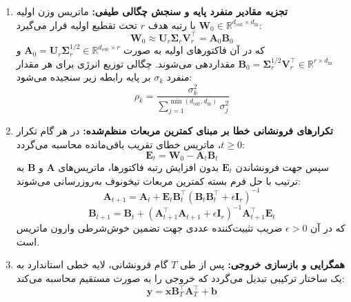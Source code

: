 \begin{enumerate}
    \item \textbf{تجزیه مقادیر منفرد پایه و سنجش چگالی طیفی:}
    ماتریس وزن اولیه $\mathbf{W}_0 \in \mathbb{R}^{d_{\text{out}} \times d_{\text{in}}}$ با رتبه هدف $r$ تحت تقطیع اولیه قرار می‌گیرد:
    \begin{equation}
    \mathbf{W}_0 \approx \mathbf{U}_r \mathbf{\Sigma}_r \mathbf{V}_r^\top = \mathbf{A}_0 \mathbf{B}_0
    \end{equation}
    که در آن فاکتورهای اولیه به صورت $\mathbf{A}_0 = \mathbf{U}_r \mathbf{\Sigma}_r^{1/2} \in \mathbb{R}^{d_{\text{out}} \times r}$ و $\mathbf{B}_0 = \mathbf{\Sigma}_r^{1/2} \mathbf{V}_r^\top \in \mathbb{R}^{r \times d_{\text{in}}}$ مقداردهی می‌شوند. چگالی توزیع انرژی برای هر مقدار منفرد $\sigma_k$ بر پایه رابطه زیر سنجیده می‌شود:
    \begin{equation}
    \rho_k = \frac{\sigma_k^2}{\sum_{j=1}^{\min(d_{\text{out}}, d_{\text{in}})} \sigma_j^2}
    \end{equation}

    \item \textbf{تکرارهای فرونشانی خطا بر مبنای کمترین مربعات منظم‌شده:}
    در هر گام تکرار $t \ge 0$، ماتریس خطای تقریب باقی‌مانده محاسبه می‌گردد:
    \begin{equation}
    \mathbf{E}_t = \mathbf{W}_0 - \mathbf{A}_t \mathbf{B}_t
    \end{equation}
    سپس جهت فرونشاندن $\mathbf{E}_t$ بدون افزایش رتبه فاکتورها، ماتریس‌های $\mathbf{A}$ و $\mathbf{B}$ به ترتیب با حل فرم بسته کمترین مربعات تیخونوف به‌روزرسانی می‌شوند:
    \begin{equation}
    \mathbf{A}_{t+1} = \mathbf{A}_t + \mathbf{E}_t \mathbf{B}_t^\top \left(\mathbf{B}_t \mathbf{B}_t^\top + \epsilon \mathbf{I}_r\right)^{-1}
    \end{equation}
    \begin{equation}
    \mathbf{B}_{t+1} = \mathbf{B}_t + \left(\mathbf{A}_{t+1}^\top \mathbf{A}_{t+1} + \epsilon \mathbf{I}_r\right)^{-1} \mathbf{A}_{t+1}^\top \mathbf{E}_t
    \end{equation}
    که در آن $\epsilon > 0$ ضریب تثبیت‌کننده عددی جهت تضمین خوش‌شرطی وارون ماتریس است.

    \item \textbf{همگرایی و بازسازی خروجی:}
    پس از طی $T$ گام فرونشانی، لایه خطی استاندارد به یک ساختار ترکیبی  تبدیل می‌گردد که خروجی را به صورت مستقیم محاسبه می‌کند:
    \begin{equation}
    \mathbf{y} = \mathbf{x} \mathbf{B}_T^\top \mathbf{A}_T^\top + \mathbf{b}
    \end{equation}
\end{enumerate}

